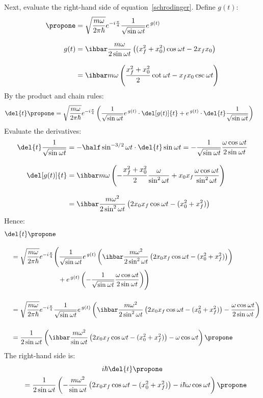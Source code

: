 Next, evaluate the right-hand side of equation~\ref{schrodinger}.
Define $g(t)$:
\begin{align*}
  \propone
   & =
  \sqrt{\frac{m\w}{2\pi\hbar}} e^{-i\frac{\pi}{4}} \frac{1}{\sqrt{\sinwt}} e^{\,g(t)}
  \\[2ex]
  g(t)
   & =
  \ihbar\frac{m\w }{2\sinwt}\left((x_f^2 + x_0^2)\coswt - 2x_f x_0\right)
  \\[2ex]
   & =
  \ihbar m\w\left( \frac{x_f^2 + x_0^2}{2}\cotwt - x_f x_0\cscwt \right)
\end{align*}
By the product and chain rules:
\begin{align*}
  \del{t}\propone
   & =
  \sqrt{\frac{m\w}{2\pi\hbar}} e^{-i\frac{\pi}{4}}
  \left(
  \frac{1}{\sqrt{\sinwt}} e^{\,g(t)}\cdot\del[g(t)]{t} +
  e^{\,g(t)}\cdot\del{t}\frac{1}{\sqrt{\sinwt}}
  \right)
\end{align*}
Evaluate the derivatives:
\begin{align*}
  \del{t}\frac{1}{\sqrt{\sinwt}}
   & =
  -\half\sinwt[-3/2]\cdot\del{t}\sinwt
  =
  -\frac{1}{\sqrt{\sinwt}}\frac{\w\coswt}{2\sinwt}
  \\[2ex]
  \del[g(t)]{t}
   & =
  \ihbar m\w \left(
  -\frac{x_f^2 + x_0^2}{2}\frac{\w}{\sinwt[2]} +
  x_0 x_f \frac{\w\coswt}{\sinwt[2]}
  \right)
  \\[2ex]
   & =
  \ihbar \frac{m\w^2}{2\sinwt[2]}\left(2x_0 x_f\coswt - (x_0^2 + x_f^2)\right)
\end{align*}
Hence:
\begin{align*}
   & \del{t}\propone
  \\[2ex]
   & \quad =
  \sqrt{\frac{m\w}{2\pi\hbar}}
  e^{-i\frac{\pi}{4}}
  \Biggl(
  \frac{1}{\sqrt{\sinwt}}
  e^{\,g(t)}
  \left(
  \ihbar\frac{m\w^2}{2\sinwt[2]}\left(2x_0 x_f\coswt - (x_0^2 + x_f^2)\right)
  \right)
  \\
   & \qquad\qquad\qquad\qquad
  + e^{\,g(t)}
  \left(
  -\frac{1}{\sqrt{\sinwt}}\frac{\w\coswt}{2\sinwt}
  \right)
  \Biggr)
  \\[3ex]
   & \quad  =
  \sqrt{\frac{m\w}{2\pi\hbar}} e^{-i\frac{\pi}{4}} \frac{1}{\sqrt{\sinwt}} e^{\,g(t)}
  \left(
  \ihbar\frac{m\w^2}{2\sinwt[2]}\left(2x_0 x_f\coswt - (x_0^2 + x_f^2)\right) -
  \frac{\w\coswt}{2\sinwt}
  \right)
  \\[3ex]
   & \quad  =
  \frac{1}{2\sinwt}
  \left(
  \ihbar\frac{m\w^2}{\sinwt}\left(2x_0 x_f\coswt - (x_0^2 + x_f^2)\right) -
  \w\coswt
  \right)
  \propone
\end{align*}
The right-hand side is:
\begin{multline}
  i\hbar\del{t}\propone
  \\
  \label{rhs}
  \quad =
  \frac{1}{2\sinwt}
  \left(
  -\frac{m\w^2}{\sinwt}\left(2x_0 x_f\coswt - (x_0^2 + x_f^2)\right) -
  i\hbar\w\coswt
  \right)
  \propone
\end{multline}
